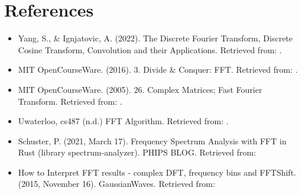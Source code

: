 \documentclass[12pt]{article}
\begin{document}
	\section{References}
 		\begin{itemize}
 			\item Yang, S., \& Ignjatovic, A. (2022). The Discrete Fourier Transform, Discrete Cosine Transform, Convolution
 			and their Applications. Retrieved from:
 			.
 			
 			\item MIT OpenCourseWare. (2016). 3. Divide \& Conquer: FFT. Retrieved from: .
 			
 			\item MIT OpenCourseWare. (2005). 26. Complex Matrices; Fast Fourier Transform. Retrieved from: .
 			
 			\item Uwaterloo, cs487 (n.d.) FFT Algorithm. Retrieved from: .
 			
 			\item Schuster, P. (2021, March 17). Frequency Spectrum Analysis with FFT in Rust (library spectrum-analyzer). PHIPS BLOG. Retrieved from: 
 			
 			\item How to Interpret FFT results - complex DFT, frequency bins and FFTShift. (2015, November 16). GaussianWaves. Retrieved from: 
 			
 			‌
 			
 			‌
 		\end{itemize}
	
\end{document}
